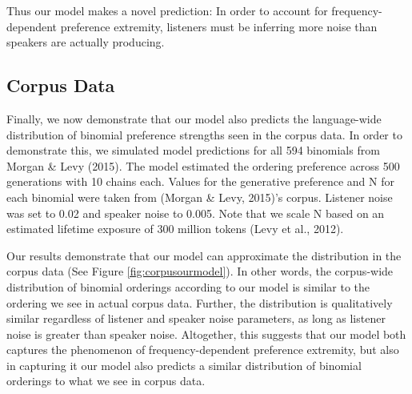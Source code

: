 \documentclass[10pt, letterpaper, hidelinks]{article}
\begin{document}
Thus our model makes a novel prediction: In order to account for
frequency-dependent preference extremity, listeners must be inferring
more noise than speakers are actually producing.

\hypertarget{corpus-data}{%
\subsection{Corpus Data}\label{corpus-data}}

Finally, we now demonstrate that our model also predicts the
language-wide distribution of binomial preference strengths seen in the
corpus data. In order to demonstrate this, we simulated model
predictions for all 594 binomials from Morgan \& Levy (2015). The model
estimated the ordering preference across 500 generations with 10 chains
each. Values for the generative preference and N for each binomial were
taken from (Morgan \& Levy, 2015)'s corpus. Listener noise was set to
0.02 and speaker noise to 0.005. Note that we scale N based on an
estimated lifetime exposure of 300 million tokens (Levy et al., 2012).

Our results demonstrate that our model can approximate the distribution
in the corpus data (See Figure \ref{fig:corpusourmodel}). In other
words, the corpus-wide distribution of binomial orderings according to
our model is similar to the ordering we see in actual corpus data.
Further, the distribution is qualitatively similar regardless of
listener and speaker noise parameters, as long as listener noise is
greater than speaker noise. Altogether, this suggests that our model
both captures the phenomenon of frequency-dependent preference
extremity, but also in capturing it our model also predicts a similar
distribution of binomial orderings to what we see in corpus data.
\end{document}
